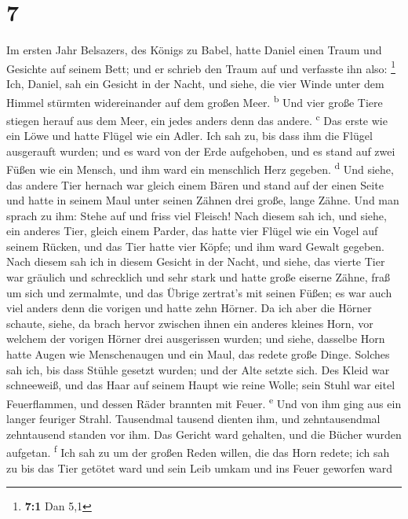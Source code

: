 \hypertarget{section-6}{%
\section{7}\label{section-6}}

 Im ersten Jahr Belsazers, des Königs zu Babel, hatte
Daniel einen Traum und Gesichte auf seinem Bett; und er schrieb den
Traum auf und verfasste ihn also: \footnote{\textbf{7:1} Dan 5,1}
 Ich, Daniel, sah ein Gesicht in der Nacht, und siehe, die
vier Winde unter dem Himmel stürmten widereinander auf dem großen Meer.
\textsuperscript{b}  Und vier große Tiere stiegen herauf
aus dem Meer, ein jedes anders denn das andere. \textsuperscript{c}
 Das erste wie ein Löwe und hatte Flügel wie ein Adler.
Ich sah zu, bis dass ihm die Flügel ausgerauft wurden; und es ward von
der Erde aufgehoben, und es stand auf zwei Füßen wie ein Mensch, und ihm
ward ein menschlich Herz gegeben. \textsuperscript{d}  Und
siehe, das andere Tier hernach war gleich einem Bären und stand auf der
einen Seite und hatte in seinem Maul unter seinen Zähnen drei große,
lange Zähne. Und man sprach zu ihm: Stehe auf und friss viel Fleisch!
 Nach diesem sah ich, und siehe, ein anderes Tier, gleich
einem Parder, das hatte vier Flügel wie ein Vogel auf seinem Rücken, und
das Tier hatte vier Köpfe; und ihm ward Gewalt gegeben. 
Nach diesem sah ich in diesem Gesicht in der Nacht, und siehe, das
vierte Tier war gräulich und schrecklich und sehr stark und hatte große
eiserne Zähne, fraß um sich und zermalmte, und das Übrige zertrat's mit
seinen Füßen; es war auch viel anders denn die vorigen und hatte zehn
Hörner.  Da ich aber die Hörner schaute, siehe, da brach
hervor zwischen ihnen ein anderes kleines Horn, vor welchem der vorigen
Hörner drei ausgerissen wurden; und siehe, dasselbe Horn hatte Augen wie
Menschenaugen und ein Maul, das redete große Dinge. 
Solches sah ich, bis dass Stühle gesetzt wurden; und der Alte setzte
sich. Des Kleid war schneeweiß, und das Haar auf seinem Haupt wie reine
Wolle; sein Stuhl war eitel Feuerflammen, und dessen Räder brannten mit
Feuer. \textsuperscript{e}  Und von ihm ging aus ein
langer feuriger Strahl. Tausendmal tausend dienten ihm, und
zehntausendmal zehntausend standen vor ihm. Das Gericht ward gehalten,
und die Bücher wurden aufgetan. \textsuperscript{f}  Ich
sah zu um der großen Reden willen, die das Horn redete; ich sah zu bis
das Tier getötet ward und sein Leib umkam und ins Feuer geworfen ward
